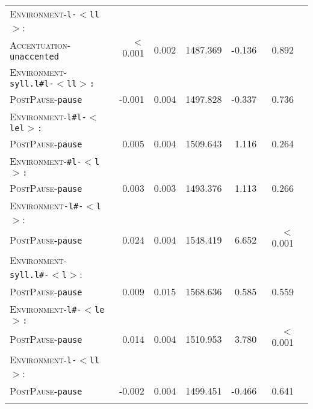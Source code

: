 \begin{table}
{\begin{tabular} {lrrrrrr}
		\textsc{Environment}-\texttt{l-$<$ll$>$}:&&&&&\\
		\textsc{Accentuation}-\texttt{unaccented} & \color{lsLightGray} $<$0.001 &\color{lsLightGray}  0.002 & \color{lsLightGray} 1487.369 &\color{lsLightGray}  -0.136 & \color{lsLightGray} 0.892 \\ 
		
		\textsc{Environment}-\texttt{syll.l\#l-$<$ll$>$:}&&&&&\\
		\textsc{PostPause}-\texttt{pause} &\color{lsLightGray}  -0.001 &\color{lsLightGray}  0.004 & \color{lsLightGray} 1497.828 &\color{lsLightGray}  -0.337 & \color{lsLightGray} 0.736 \\ 
		
		\textsc{Environment}-\texttt{l\#l-$<$lel$>$:}&&&&&\\
		\textsc{PostPause}-\texttt{pause} &\color{lsLightGray}  0.005 &\color{lsLightGray}  0.004 &\color{lsLightGray} 1509.643 & \color{lsLightGray} 1.116 &\color{lsLightGray}  0.264 \\ 
		
		\textsc{Environment}-\texttt{\#l-$<$l$>$:}&&&&&\\
		\textsc{PostPause}-\texttt{pause} & \color{lsLightGray} 0.003 &\color{lsLightGray}  0.003 & \color{lsLightGray} 1493.376 &\color{lsLightGray}  1.113 & \color{lsLightGray} 0.266 \\ 
		
		\textsc{Environment}\texttt{-l\#-$<$l$>$}:&&&&&\\
		\textsc{PostPause}-\texttt{pause} & 0.024 & 0.004 & 1548.419 & 6.652 &  $<$0.001 \\ 
		
		\textsc{Environment}-\texttt{syll.l\#-$<$l$>$}:&&&&&\\
		\textsc{PostPause}-\texttt{pause} &\color{lsLightGray}  0.009 &\color{lsLightGray}  0.015 & \color{lsLightGray} 1568.636 &\color{lsLightGray}  0.585 & \color{lsLightGray} 0.559 \\ 
		
		\textsc{Environment}-\texttt{l\#-$<$le$>$:}&&&&&\\
		\textsc{PostPause}-\texttt{pause} & 0.014 & 0.004 & 1510.953 & 3.780 &  $<$0.001 \\
		
		\textsc{Environment}-\texttt{l-$<$ll$>$}:&&&&&\\
		\textsc{PostPause}-\texttt{pause} & \color{lsLightGray} -0.002 & \color{lsLightGray} 0.004 & \color{lsLightGray} 1499.451 &\color{lsLightGray}  -0.466 & \color{lsLightGray} 0.641 \\ 
	\lspbottomrule 
			\end{tabular}
}


\end{table}



